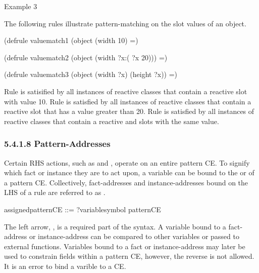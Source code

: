 \documentclass[letterpaper,10pt,english]{sphinxmanual}
\begin{document}
Example 3

The following rules illustrate pattern-matching on the slot values of an
object.

\begin{sphinxVerbatim}[commandchars=\\\{\}]
(defrule value\PYGZhy{}match\PYGZhy{}1
  (object (width 10)
  =\PYGZgt{})

(defrule value\PYGZhy{}match\PYGZhy{}2
  (object (width ?x\PYGZam{}:(\PYGZgt{} ?x 20)))
  =\PYGZgt{})

(defrule value\PYGZhy{}match\PYGZhy{}3
  (object (width ?x) (height ?x))
  =\PYGZgt{})
\end{sphinxVerbatim}

Rule  is satisified by all instances of reactive classes
that contain a reactive  slot with value 10. Rule 
is satisfied by all instances of reactive classes that contain a
reactive  slot that has a value greater than 20. Rule
 is satisfied by all instances of reactive classes that
contain a reactive  and  slots with the same value.


\subsubsection{5.4.1.8 Pattern-Addresses}
\label{\detokenize{defrule:pattern-addresses}}
Certain RHS actions, such as  and ,
operate on an entire pattern CE. To signify which fact or instance they
are to act upon, a variable can be bound to the  or
 of a pattern CE. Collectively, fact-addresses and
instance-addresses bound on the LHS of a rule are referred to as
.


\begin{sphinxVerbatim}[commandchars=\\\{\}]
\PYGZlt{}assigned\PYGZhy{}pattern\PYGZhy{}CE\PYGZgt{} ::= ?\PYGZlt{}variable\PYGZhy{}symbol\PYGZgt{} \PYGZlt{}\PYGZhy{} \PYGZlt{}pattern\PYGZhy{}CE\PYGZgt{}
\end{sphinxVerbatim}

The left arrow, \sphinxstylestrong{\textless{}-}, is a required part of the syntax. A variable
bound to a fact-address or instance-address can be compared to other
variables or passed to external functions. Variables bound to a fact or
instance-address may later be used to constrain fields within a pattern
CE, however, the reverse is not allowed. It is an error to bind a
varible to a  CE.
\end{document}
